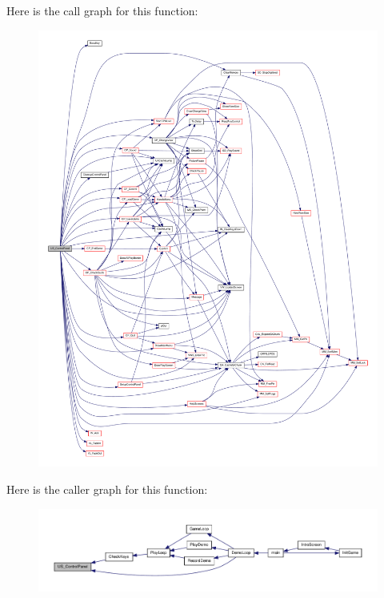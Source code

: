 Here is the call graph for this function:
\nopagebreak
\begin{figure}[H]
\begin{center}
\leavevmode
\includegraphics[width=400pt]{WL__MENU_8C_ac823c95233ba863de18fe1d9f39caa1e_cgraph}
\end{center}
\end{figure}




Here is the caller graph for this function:
\nopagebreak
\begin{figure}[H]
\begin{center}
\leavevmode
\includegraphics[width=400pt]{WL__MENU_8C_ac823c95233ba863de18fe1d9f39caa1e_icgraph}
\end{center}
\end{figure}


